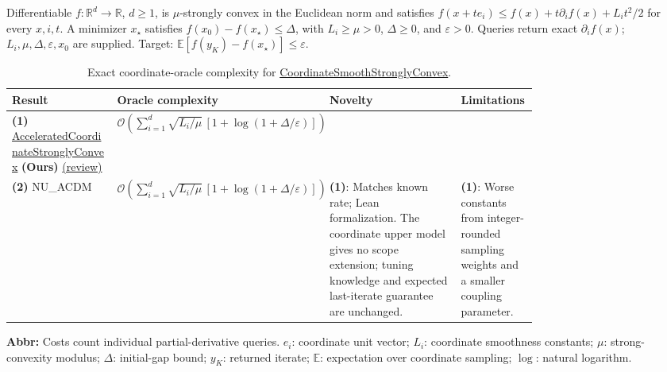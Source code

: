 \begin{table}[tp]
\centering
\caption{Exact coordinate-oracle complexity for \href{https://github.com/k3nfalt/longtails/blob/main/LongTails/Setups/CoordinateSmoothStronglyConvex.lean}{CoordinateSmoothStronglyConvex}.}\label{tab:CoordinateSmoothStronglyConvex}
\parbox{\linewidth}{\footnotesize Differentiable $f:\mathbb{R}^d\to\mathbb{R}$, $d\ge1$, is $\mu$-strongly convex in the Euclidean norm and satisfies $f(x+te_i)\le f(x)+t\partial_i f(x)+L_i t^2/2$ for every $x,i,t$. A minimizer $x_\star$ satisfies $f(x_0)-f(x_\star)\le\Delta$, with $L_i\ge\mu>0$, $\Delta\ge0$, and $\varepsilon>0$. Queries return exact $\partial_i f(x)$; $L_i,\mu,\Delta,\varepsilon,x_0$ are supplied. Target: $\mathbb{E}[f(y_K)-f(x_\star)]\le\varepsilon$.}\par\smallskip
\begin{threeparttable}
\footnotesize
\setlength{\tabcolsep}{4pt}\renewcommand{\arraystretch}{1.25}
\begin{tabularx}{\linewidth}{@{}>{\raggedright\arraybackslash}p{0.20\linewidth}>{\raggedright\arraybackslash}p{0.32\linewidth}>{\raggedright\arraybackslash}p{0.25\linewidth}>{\raggedright\arraybackslash}X@{}}
\toprule
\textbf{Result} & \textbf{Oracle complexity} & \textbf{Novelty} & \textbf{Limitations} \\
\midrule
\textbf{(1)} \href{https://github.com/k3nfalt/longtails/blob/main/LongTails/Theorems/AcceleratedCoordinateStronglyConvex.lean}{Accelerated\allowbreak Coordinate\allowbreak Strongly\allowbreak Convex} \textbf{(Ours)} \href{https://github.com/k3nfalt/longtails/blob/main/scripts/reviews/AcceleratedCoordinateStronglyConvex.md}{(review)}
& $\mathcal{O}\!\left(\sum_{i=1}^{d}\sqrt{L_i/\mu}\,[1+\log(1+\Delta/\varepsilon)]\right)$ & & \\
\midrule[1.2pt]
\textbf{(2)} NU\_ACDM \citep[arXiv v3, Theorem~5.1, $\beta=0$]{allenZhuQuRichtarikYuan2016Coordinate}
& $\mathcal{O}\!\left(\sum_{i=1}^{d}\sqrt{L_i/\mu}\,[1+\log(1+\Delta/\varepsilon)]\right)$
& \textbf{(1)}: Matches known rate; Lean formalization. The coordinate upper model gives no scope extension; tuning knowledge and expected last-iterate guarantee are unchanged.
& \textbf{(1)}: Worse constants from integer-rounded sampling weights and a smaller coupling parameter. \\
\bottomrule
\end{tabularx}
\begin{tablenotes}[flushleft]\footnotesize
\item[] \textbf{Abbr:} Costs count individual partial-derivative queries. $e_i$: coordinate unit vector; $L_i$: coordinate smoothness constants; $\mu$: strong-convexity modulus; $\Delta$: initial-gap bound; $y_K$: returned iterate; $\mathbb{E}$: expectation over coordinate sampling; $\log$: natural logarithm.
\end{tablenotes}
\end{threeparttable}
\end{table}
\clearpage
